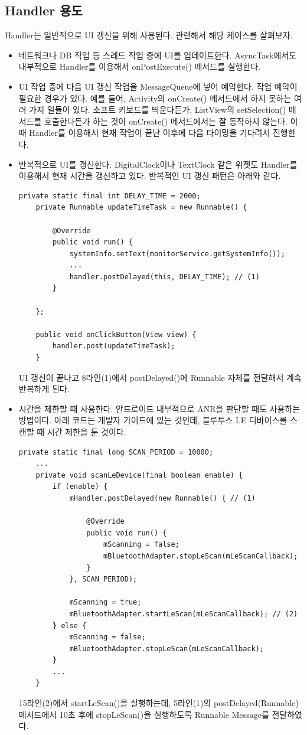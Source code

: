 \subsection{Handler 용도}
Handler는 일반적으로 UI 갱신을 위해 사용된다. 관련해서 해당 케이스를 살펴보자.
\begin{itemize}
\item 네트워크나 DB 작업 등 스레드 작업 중에 UI를 업데이트한다. 
AsyncTask에서도 내부적으로 Handler를 이용해서 onPostExecute() 메서드를 실행한다.
\item UI 작업 중에 다음 UI 갱신 작업을 MessageQueue에 넣어 예약한다. 작업 예약이 필요한 경우가 있다.
예를 들어, Activity의 onCreate() 메서드에서 하지 못하는 여러 가지 일들이 있다. 소프트 키보드를 띄운다든가, ListView의 setSelection() 메서드를 호출한다든가 하는 것이 onCreate() 메서드에서는 잘 동작하지 않는다. 이때 Handler를 이용해서 현재 작업이 끝난 이후에 다음 타이밍을 기다려서 진행한다.
\item 반복적으로 UI를 갱신한다. DigitalClock이나 TextClock 같은 위젯도 Handler를 이용해서 현재 시간을 갱신하고 있다.
반복적인 UI 갱신 패턴은 아래와 같다.
\begin{lstlisting}[frame=single] 
  	private static final int DELAY_TIME = 2000;
	private Runnable updateTimeTask = new Runnable() {

		@Override
		public void run() {
			systemInfo.setText(monitorService.getSystemInfo());
			...
			handler.postDelayed(this, DELAY_TIME); // (1)
		}

	};
	
	public void onClickButton(View view) {
		handler.post(updateTimeTask); 
	}
\end{lstlisting}
UI 갱신이 끝나고 8라인(1)에서 postDelayed()에 Runnable 자체를 전달해서 계속 반복하게 된다.
\item 시간을 제한할 때 사용한다. 안드로이드 내부적으로 ANR을 판단할 때도 사용하는 방법이다.
아래 코드는 개발자 가이드에 있는 것인데, 블루투스 LE 디바이스를 스캔할 때 시간 제한을 둔 것이다.
\begin{lstlisting}[frame=single] 
	private static final long SCAN_PERIOD = 10000;
	...
	private void scanLeDevice(final boolean enable) {
	    if (enable) {
	    	mHandler.postDelayed(new Runnable() { // (1)
	    		
	    		@Override
	    		public void run() {
	    			mScanning = false;
	    			mBluetoothAdapter.stopLeScan(mLeScanCallback);
	    		}
	    	}, SCAN_PERIOD);
	
	    	mScanning = true;
	    	mBluetoothAdapter.startLeScan(mLeScanCallback); // (2)
	    } else {
	    	mScanning = false;
	    	mBluetoothAdapter.stopLeScan(mLeScanCallback);
	    }
	    ...
	}
\end{lstlisting}
15라인(2)에서 startLeScan()을 실행하는데, 5라인(1)의 postDelayed(Runnable) 메서드에서 10초 후에 stopLeScan()을 실행하도록 Runnable Message를 전달하였다.\\


\end{itemize}
